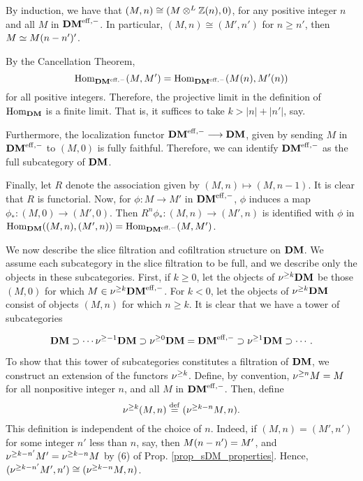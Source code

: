 \begin{rmk}
By induction, we have that $(M, n) \cong (M \tDM \Z(n), 0)$, for 
any positive integer $n$ and all $M$ in $\DMeff$. In particular,
$(M, n) \cong (M', n')$ for $n \geq n'$, then $M \simeq 
\tZ[n - n']M'$.
\end{rmk}

\begin{rmk}\label{rmk_homs_in_DM}
By the Cancellation Theorem, 
\[
\homDMf(M, M') = \homDMf(\tZ[n]{M}, \tZ[n]{M'})
\]
for all positive integers. Therefore, the projective limit in the 
definition of $\homDM$ is a finite limit. That is, it suffices to 
take $k > |n| + |n'|$, say.

Furthermore, the localization functor $\DMeff \to \DM$, given by
sending $M$ in $\DMeff$ to $(M, 0)$ is fully faithful. Therefore, we 
can identify $\DMeff$ as the full subcategory of $\DM$.

Finally, let $R$ denote the association given by $(M, n) \mapsto
(M, n - 1)$. It is clear that $R$ is functorial. Now, for $\phi: 
M \to M'$ in $\DMeff$, $\phi$ induces a map $\phi_*: (M, 0)
\to (M', 0)$. Then $R^n\phi_* : (M, n) \to (M', n)$ is identified 
with $\phi$ in $\homDM((M, n), (M', n)) = \homDMf(M, M')$.
\end{rmk}

We now describe the slice filtration and cofiltration structure on 
$\DM$. We assume each subcategory in the slice filtration to be 
full, and we describe only the objects in these subcategories. 
First, if $k \geq 0$, let the objects of $\sgDM{k} \DM$ be those 
$(M, 0)$ for which $M \in \sgDM{k} \DMeff$. For $k < 0$, let the 
objects of $\sgDM{k} \DM$ consist of objects $(M, n)$ for which 
$n \geq k$. It is clear that we have a tower of subcategories

\begin{equation}\label{eq_DM_slice_filt}
\DM \supset \cdots \sgDM{-1}\DM \supset \sgDM{0}\DM = \DMeff 
   \supset \sgDM{1}\DM \supset \cdots.
\end{equation}

To show that this tower of subcategories constitutes a filtration
of $\DM$, we construct an extension of the functors $\sgDM{k}$.
Define, by convention, $\sgDM{n} M = M$ for all nonpositive 
integer $n$, and all $M$ in $\DMeff$. Then, define
\[
\sgDM{k}(M, n) \defeq (\sgDM{k - n}M, n).
\]
This definition is independent of the choice of $n$. Indeed, if
$(M, n) = (M', n')$ for some integer $n'$ less than $n$, say, then
$\tZ[n - n']{M} = M'$, and $\sgDM{k - n'}M' = \sgDM{k - n}M$ by
(6) of Prop. \ref{prop_sDM_properties}. Hence, $(\sgDM{k - n'}M', 
n') \cong (\sgDM{k - n}M, n)$.

